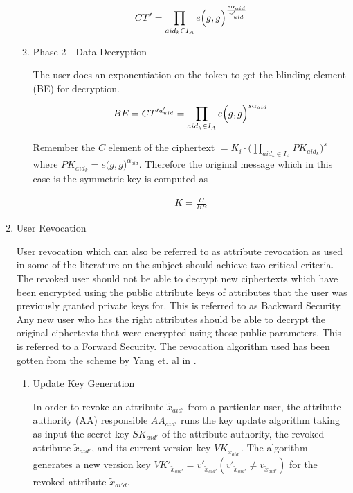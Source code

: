 \begin{enumerate}
\begin{enumerate}
		\begin{align*}
			CT' = \prod\limits_{aid_{k} \in I_{A}} e\Bigl(g, g\Bigl)^{\frac{s\alpha_{aid}}{u'_{uid}}}
		\end{align*}
		
		
		\item Phase 2 - Data Decryption
		
		The user does an exponentiation on the token to get the blinding element (BE) for decryption.
		
		\begin{align*}
			BE= CT'^{u'_{uid}} = \prod\limits_{aid_{k} \in I_{A}} e\Bigl(g, g\Bigl)^{s\alpha_{aid}}
		\end{align*}
		
		Remember the $C$ element of the ciphertext $= K_i\cdot\bigl(\prod\limits_{aid_{k} \in I_{A}}PK_{aid_{k}}\bigl)^{s}$ where $PK_{aid_{k}} = e\bigl(g, g\bigl)^{\alpha_{aid}}$. Therefore the original message which in this case is the symmetric key is computed as
		
		\begin{align*}
			K = \frac{C}{BE}
		\end{align*}
	\end{enumerate}
	
	\item User Revocation
	
	User revocation which can also be referred to as attribute revocation as used in some of the literature on the subject should achieve two critical criteria. The revoked user should not be able to decrypt new ciphertexts which have been encrypted using the public attribute keys of attributes that the user was previously granted private keys for. This is referred to as Backward Security. Any new user who has the right attributes should be able to decrypt the original ciphertexts that were encrypted using those public parameters. This is referred to a Forward Security. The revocation algorithm used has been gotten from the scheme by Yang et. al in \cite{Yang2014}.
	
	
	\begin{enumerate}
		\item Update Key Generation
		
		In order to revoke an attribute $\tilde{x}_{aid'}$ from a particular user, the attribute authority (AA) responsible $AA_{aid'}$ runs the key update algorithm taking as input the secret key $SK_{aid'}$ of the 
		attribute authority, the revoked attribute $\tilde{x}_{aid'}$, and its current version key $VK_{\tilde{x}_{aid'}}$.
		The algorithm generates a new version key $VK'_{\tilde{x}_{aid'}} = v'_{\tilde{x}_{aid'}} (v'_{\tilde{x}_{aid'}} \neq v_{\tilde{x}_{aid'}})$ for the revoked attribute $\tilde{x}_{ai'd}$.
		

\end{enumerate}
\end{enumerate}
